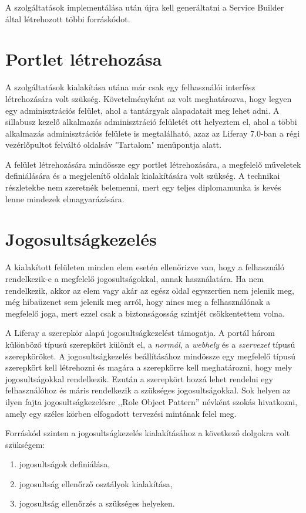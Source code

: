 \documentclass[hidelinks, 12pt, a4paper]{report}
\begin{document}
A szolgáltatások implementálása után újra kell generáltatni a Service Builder által létrehozott többi forráskódot.

\section{Portlet létrehozása}

A szolgáltatások kialakítása utána már csak egy felhasználói interfész létrehozására volt szükség. Követelményként az volt meghatározva, hogy legyen egy adminisztrációs felület, ahol a tantárgyak alapadatait meg lehet adni. A sillabusz kezelő alkalmazás adminisztráció felületét ott helyeztem el, ahol a többi alkalmazás adminisztrációs felülete is megtalálható, azaz az Liferay 7.0-ban a régi vezérlőpultot felváltó oldalsáv "Tartalom" menüpontja alatt.

A felület létrehozására mindössze egy portlet létrehozására, a megfelelő műveletek definiálására és a megjelenítő oldalak kialakítására volt szükség. A technikai részletekbe nem szeretnék belemenni, mert egy teljes diplomamunka is kevés lenne mindezek elmagyarázására.

\section{Jogosultságkezelés}

A kialakított felületen minden elem esetén ellenőrizve van, hogy a felhasználó rendelkezik-e a megfelelő jogosultságokkal, annak használatára. Ha nem rendelkezik, akkor az elem vagy akár az egész oldal egyszerűen nem jelenik meg, még hibaüzenet sem jelenik meg arról, hogy nincs meg a felhasználónak a megfelelő joga, mert ezzel csak a biztonságosság szintjét csökkentettem volna.

A Liferay a szerepkör alapú jogosultságkezelést támogatja. A portál három különböző típusú szerepkört különít el, a \emph{normál}, a \emph{webhely} és a \emph{szervezet} típusú szerepköröket. A jogosultságkezelés beállításához mindössze egy megfelelő típusú szerepkört kell létrehozni és magára a szerepkörre kell meghatározni, hogy mely jogosultságokkal rendelkezik. Ezután a szerepkört hozzá lehet rendelni egy felhasználóhoz és máris rendelkezik a szükséges jogosultságokkal. Sok helyen az ilyen fajta jogosultságkezelésre ,,Role Object Pattern'' névként szokás hivatkozni, amely egy széles körben elfogadott tervezési mintának felel meg.

Forráskód szinten a jogosultságkezelés kialakításához a következő dolgokra volt szükségem:
\begin{enumerate}
\item jogosultságok definiálása,
\item jogosultság ellenőrző osztályok kialakítása,
\item jogosultság ellenőrzés a szükséges helyeken.
\end{enumerate}
\end{document}
